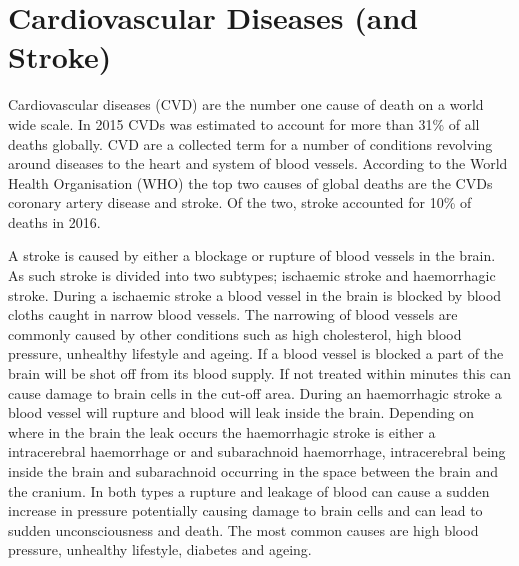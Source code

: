
\section{Cardiovascular Diseases (and Stroke)}

Cardiovascular diseases (CVD) are the number one cause of death on a world wide scale. In 2015 CVDs was estimated to account for more than 31\% of all deaths globally. \cite{whocvd2017} CVD are a collected term for a number of conditions revolving around diseases to the heart and system of blood vessels. According to the World Health Organisation (WHO) the top two causes of global deaths are the CVDs coronary artery disease and stroke. Of the two, stroke accounted for 10\% of deaths in 2016. \cite{whoMortalityStats2018}



A stroke is caused by either a blockage or rupture of blood vessels in the brain. As such stroke is divided into two subtypes; ischaemic stroke and haemorrhagic stroke. During a ischaemic stroke a blood vessel in the brain is blocked by blood cloths caught in narrow blood vessels. The narrowing of blood vessels are commonly caused by other conditions such as high cholesterol, high blood pressure, unhealthy lifestyle and ageing. If a blood vessel is blocked a part of the brain will be shot off from its blood supply. If not treated within minutes this can cause damage to brain cells in the cut-off area. \cite{Mackay2002, Hering2017chap7, InternetStroke2018} 
During an haemorrhagic stroke a blood vessel will rupture and blood will leak inside the brain. Depending on where in the brain the leak occurs the haemorrhagic stroke is either a intracerebral haemorrhage or and subarachnoid haemorrhage, intracerebral being inside the brain and subarachnoid occurring in the space between the brain and the cranium. In both types a rupture and leakage of blood can cause a sudden increase in pressure potentially causing damage to brain cells and can lead to sudden unconsciousness and death. The most common causes are high blood pressure, unhealthy lifestyle, diabetes and ageing. \cite{Mackay2002, Hering2017chap8, InternetStroke2018}

